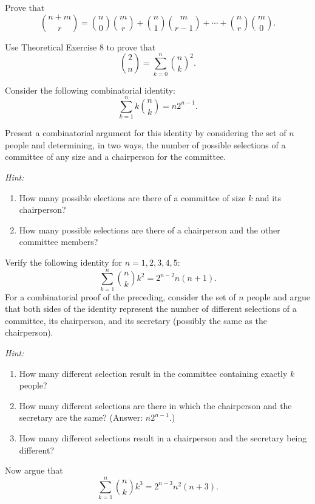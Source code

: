\begin{problem}[Ross, \S 1, \# 8]
  Prove that
  \[
    \binom{n+m}{r}=%
    \binom{n}{0}\binom{m}{r}+\binom{n}{1}\binom{m}{r-1}%
    +\dotsb+\binom{n}{r}\binom{m}{0}.
  \]
\end{problem}
\begin{solution*}
\end{solution*}

\begin{problem}[Ross, \S 1, \# 9]
  Use Theoretical Exercise 8 to prove that
  \[
    \binom{2}{n}=\sum_{k=0}^n\binom{n}{k}^2.
  \]
\end{problem}
\begin{solution*}
\end{solution*}

\begin{problem}[Ross, \S 1, \# 12]
  Consider the following combinatorial identity:
  \[
    \sum_{k=1}^n k\binom{n}{k}=n2^{n-1}.
  \]
  \begin{alphlist}
  \item Present a combinatorial argument for this identity by considering
    the set of \(n\) people and determining, in two ways, the number of
    possible selections of a committee of any size and a chairperson for
    the committee.

    \noindent\emph{Hint:}
    \begin{enumerate}[label=(\roman*)]
    \item How many possible elections are there of a committee of size
      \(k\) and its chairperson?
    \item How many possible selections are there of a chairperson and the
      other committee members?
    \end{enumerate}
  \item Verify the following identity for \(n=1,2,3,4,5\):
    \[
      \sum_{k=1}^n \binom{n}{k}k^2=2^{n-2}n(n+1).
    \]
    For a combinatorial proof of the preceding, consider the set of \(n\)
    people and argue that both sides of the identity represent the number
    of different selections of a committee, its chairperson, and its
    secretary (possibly the same as the chairperson).

    \noindent\emph{Hint:}
    \begin{enumerate}[label=(\roman*)]
    \item How many different selection result in the committee containing
      exactly \(k\) people?
    \item How many different selections are there in which the chairperson
      and the secretary are the same? (Answer: \(n2^{n-1}\).)
    \item How many different selections result in a chairperson and the
      secretary being different?
    \end{enumerate}
  \item Now argue that
    \[
      \sum_{k=1}^n\binom{n}{k}k^3=2^{n-3}n^2(n+3).
    \]
  \end{alphlist}
\end{problem}
\begin{solution*}
\end{solution*}

